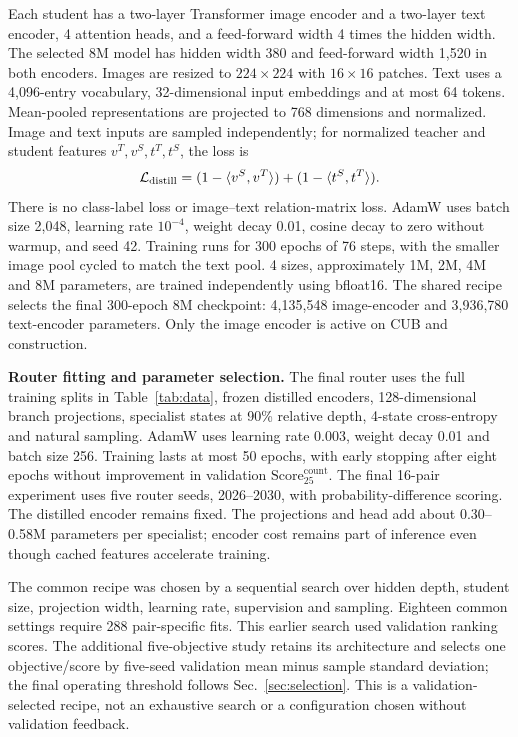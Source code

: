 Each student has a two-layer Transformer image encoder and a two-layer text encoder, 4 attention heads, and a feed-forward width 4 times the hidden width. The selected 8M model has hidden width 380 and feed-forward width 1,520 in both encoders. Images are resized to $224\times224$ with $16\times16$ patches. Text uses a 4,096-entry vocabulary, 32-dimensional input embeddings and at most 64 tokens. Mean-pooled representations are projected to 768 dimensions and normalized. Image and text inputs are sampled independently; for normalized teacher and student features $v^T,v^S,t^T,t^S$, the loss is
\begin{equation}
\mathcal L_{\rm distill}=(1-\langle v^S,v^T\rangle)
+(1-\langle t^S,t^T\rangle).
\label{eq:distill}
\end{equation}
There is no class-label loss or image--text relation-matrix loss. AdamW uses batch size 2,048, learning rate $10^{-4}$, weight decay 0.01, cosine decay to zero without warmup, and seed 42. Training runs for 300 epochs of 76 steps, with the smaller image pool cycled to match the text pool. 4 sizes, approximately 1M, 2M, 4M and 8M parameters, are trained independently using bfloat16. The shared recipe selects the final 300-epoch 8M checkpoint: 4,135,548 image-encoder and 3,936,780 text-encoder parameters. Only the image encoder is active on CUB and construction.

\textbf{Router fitting and parameter selection.}
The final router uses the full training splits in Table~\ref{tab:data}, frozen distilled encoders, 128-dimensional branch projections, specialist states at 90\% relative depth, 4-state cross-entropy and natural sampling. AdamW uses learning rate 0.003, weight decay 0.01 and batch size 256. Training lasts at most 50 epochs, with early stopping after eight epochs without improvement in validation $\mathrm{Score}_{25}^{\mathrm{count}}$. The final 16-pair experiment uses five router seeds, 2026--2030, with probability-difference scoring. The distilled encoder remains fixed. The projections and head add about 0.30--0.58M parameters per specialist; encoder cost remains part of inference even though cached features accelerate training.

The common recipe was chosen by a sequential search over hidden depth, student size, projection width, learning rate, supervision and sampling. Eighteen common settings require 288 pair-specific fits. This earlier search used validation ranking scores. The additional five-objective study retains its architecture and selects one objective/score by five-seed validation mean minus sample standard deviation; the final operating threshold follows Sec.~\ref{sec:selection}. This is a validation-selected recipe, not an exhaustive search or a configuration chosen without validation feedback.

